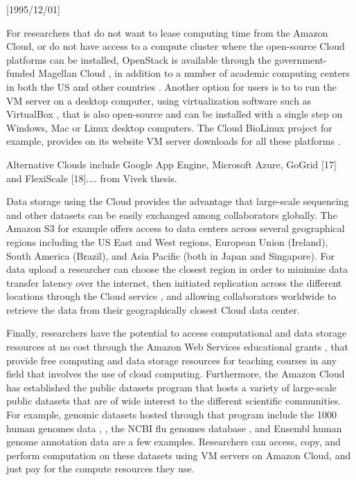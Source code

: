 \NeedsTeXFormat{LaTeX2e}[1995/12/01] \documentclass[10pt]{bmc_article}
\newenvironment{bmcformat}{\begin{raggedright}\baselineskip20pt\sloppy\setboolean{publ}{false}}{\end{raggedright}\baselineskip20pt\sloppy}
\begin{document}
\begin{bmcformat}
For researchers that do not want to lease computing time from the Amazon Cloud, or do not have access to a 
compute cluster where the open-source Cloud platforms can be installed, OpenStack is 
available through the government-funded  Magellan Cloud \cite{magellan}, in addition to a number of academic 
computing centers in both the US and other countries \cite{openstackinstalls}. Another option for users is to
to run the VM server on a desktop computer, using virtualization software such as VirtualBox \cite{vbox}, that
is also open-source and can be installed with a single step on Windows, Mac or Linux desktop computers. The
Cloud BioLinux project for example, provides on its website VM server downloads for all these platforms \cite{cblorg}.

Alternative Clouds include Google App Engine, Microsoft Azure, GoGrid [17] and FlexiScale [18].... from Vivek thesis.

Data storage using the Cloud provides the advantage that large-scale sequencing and other datasets can be 
easily exchanged among collaborators globally. The Amazon S3 for example \cite{s3} offers access to data
centers across several geographical regions including the US East and West regions, European Union (Ireland), 
South America (Brazil), and Asia Pacific (both in Japan and Singapore). For data upload a researcher can choose 
the closest region in order to minimize data transfer latency over the internet, then initiated replication across 
the different locations through the Cloud service \cite{cloudfront}, and allowing collaborators worldwide to  
retrieve the data from their geographically closest Cloud data center.

Finally, researchers have the potential to access computational and data storage resources at no cost through 
the  Amazon Web Services educational grants \cite{awsgrants}, that provide free computing and data storage 
resources for teaching courses in any field that involves the use of cloud computing. Furthermore, the Amazon
Cloud has established the public datasets program \cite{awspublicdata} that hosts a variety of large-scale public 
datasets that are of wide interest to the different scientific communities. For example, genomic datasets hosted 
through that program include the 1000 human genomes data \cite{Clarke2012}, \cite{aws1000gen}, the NCBI 
flu genomes database \cite{awsflu}, and Ensembl human genome annotation data \cite{awsensembl} are a few 
examples. Researchers can access, copy, and perform computation on these datasets using VM servers on Amazon
Cloud, and just pay for the compute resources they use.


\end{bmcformat}
\end{document}
